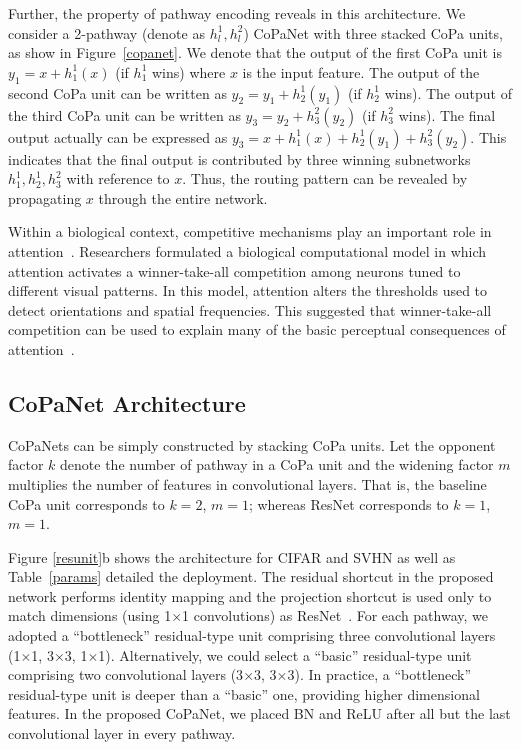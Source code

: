\documentclass[wcp]{jmlr}
\begin{document}
Further, the property of pathway encoding reveals in this architecture.
We consider a 2-pathway (denote as $h^1_l, h^2_l$) CoPaNet with three stacked CoPa units, as show in Figure~\ref{copanet}.
We denote that the output of the first CoPa unit is $y_1 = x + h^1_1(x)$ (if $h^1_1$ wins) where $x$ is the input feature.
The output of the second CoPa unit can be written as $y_2 = y_1 + h^1_2(y_1)$ (if $h^1_2$ wins).
The output of the third CoPa unit can be written as $y_3 = y_2 + h^2_3(y_2)$ (if $h^2_3$ wins).
The final output actually can be expressed as $y_3 = x + h^1_1(x) + h^1_2(y_1) + h^2_3(y_2)$.
This indicates that the final output is contributed by three winning subnetworks $h^1_1,  h^1_2, h^2_3$ with reference to $x$.
Thus, the routing pattern can be revealed by propagating $x$ through the entire network.

Within a biological context, competitive mechanisms play an important role in attention~\citep{lee1999attention}. 
Researchers formulated a biological computational model in which attention activates a winner-take-all competition among neurons tuned to different visual patterns. 
In this model, attention alters the thresholds used to detect orientations and spatial frequencies. 
This suggested that winner-take-all competition can be used to explain many of the basic perceptual consequences of attention~\citep{lee1999attention}.

\subsection{CoPaNet Architecture}
CoPaNets can be simply constructed by stacking CoPa units. 
Let the opponent factor $k$ denote the number of pathway in a CoPa unit and the widening factor $m$ multiplies the number of features in convolutional layers.
That is, the baseline CoPa unit corresponds to $k = 2$, $m=1$; whereas ResNet corresponds to $k = 1$, $m=1$.

Figure \ref{resunit}b shows the architecture for CIFAR and SVHN as well as Table~\ref{params} detailed the deployment.
The residual shortcut in the proposed network performs identity mapping and the projection shortcut is used only to match dimensions (using 1$\times$1 convolutions) as ResNet~\citep{he2015deep,he2016identity}. 
For each pathway, we adopted a ``bottleneck'' residual-type unit comprising three convolutional layers (1$\times$1, 3$\times$3, 1$\times$1). 
Alternatively, we could select a ``basic'' residual-type unit comprising two convolutional layers (3$\times$3, 3$\times$3). 
In practice, a ``bottleneck'' residual-type unit is deeper than a ``basic'' one, providing higher dimensional features. 
In the proposed CoPaNet, we placed BN and ReLU after all but the last convolutional layer in every pathway. 
\end{document}
